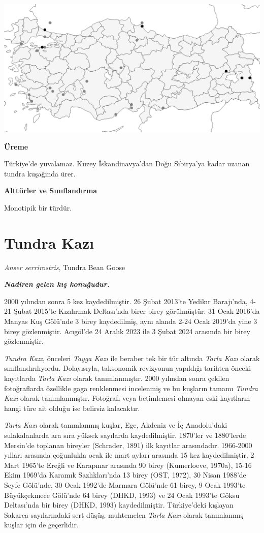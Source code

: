 \documentclass[
  a4paper,
  DIV=11,
  numbers=noendperiod]{scrartcl}
\begin{document}
\includegraphics{images/harita_Anser erythropus.png}

\textbf{Üreme}

Türkiye'de yuvalamaz. Kuzey İskandinavya'dan Doğu Sibirya'ya kadar
uzanan tundra kuşağında ürer.

\textbf{Alttürler ve Sınıflandırma}

Monotipik bir türdür.

\section{Tundra Kazı}\label{tundra-kazux131}

\emph{Anser serrirostris}, Tundra Bean Goose

\textbf{\emph{Nadiren gelen kış konuğudur.}}

2000 yılından sonra 5 kez kaydedilmiştir. 26 Şubat 2013'te Yedikır
Barajı'nda, 4-21 Şubat 2015'te Kızılırmak Deltası'nda birer birey
görülmüştür. 31 Ocak 2016'da Manyas Kuş Gölü'nde 3 birey kaydedilmiş,
aynı alanda 2-24 Ocak 2019'da yine 3 birey gözlenmiştir. Acıgöl'de 24
Aralık 2023 ile 3 Şubat 2024 arasında bir birey gözlenmiştir.

\emph{Tundra Kazı}, önceleri \emph{Tayga Kazı} ile beraber tek bir tür
altında \emph{Tarla Kazı} olarak sınıflandırılıyordu. Dolayısıyla,
taksonomik revizyonun yapıldığı tarihten önceki kayıtlarda \emph{Tarla
Kazı} olarak tanımlanmıştır. 2000 yılından sonra çekilen fotoğraflarda
özellikle gaga renklenmesi incelenmiş ve bu kuşların tamamı \emph{Tundra
Kazı} olarak tanımlanmıştır. Fotoğrafı veya betimlemesi olmayan eski
kayıtların hangi türe ait olduğu ise belirsiz kalacaktır.

\emph{Tarla Kazı} olarak tanımlanmış kuşlar, Ege, Akdeniz ve İç
Anadolu'daki sulakalanlarda ara sıra yüksek sayılarda kaydedilmiştir.
1870'ler ve 1880'lerde Mersin'de toplanan bireyler (Schrader, 1891) ilk
kayıtlar arasındadır. 1966-2000 yılları arasında çoğunlukla ocak ile
mart ayları arasında 15 kez kaydedilmiştir. 2 Mart 1965'te Ereğli ve
Karapınar arasında 90 birey (Kumerloeve, 1970a), 15-16 Ekim 1969'da
Karamık Sazlıkları'nda 13 birey (OST, 1972), 30 Nisan 1988'de Seyfe
Gölü'nde, 30 Ocak 1992'de Marmara Gölü'nde 61 birey, 9 Ocak 1993'te
Büyükçekmece Gölü'nde 64 birey (DHKD, 1993) ve 24 Ocak 1993'te Göksu
Deltası'nda bir birey (DHKD, 1993) kaydedilmiştir. Türkiye'deki kışlayan
Sakarca sayılarındaki sert düşüş, muhtemelen \emph{Tarla Kazı} olarak
tanımlanmış kuşlar için de geçerlidir.
\end{document}
